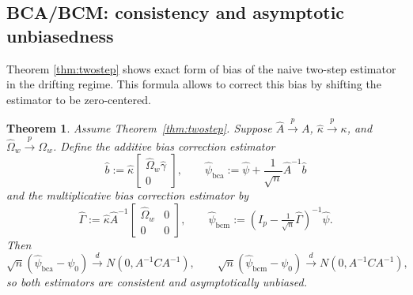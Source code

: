 \documentclass[11pt]{article}
\newtheorem{theorem}{Theorem}
\theoremstyle{definition}
\theoremstyle{remark}
\newcommand{\toP}{\xrightarrow{\,p\,}}
\newcommand{\tod}{\xrightarrow{\,d\,}}
\begin{document}
\subsection{BCA/BCM: consistency and asymptotic unbiasedness}
Theorem \ref{thm:twostep} shows exact form of bias of the naive two-step estimator in the drifting regime. This formula allows to correct this bias by shifting the estimator to be zero-centered.

\begin{theorem}\label{thm:bca-bcm}
Assume Theorem~\ref{thm:twostep}. Suppose $\hat A\toP A$, $\hat\kappa\toP\kappa$, and $\hat\Omega_w\toP\Omega_w$.
Define the additive bias correction estimator
\[
\hat b:=\hat\kappa\begin{bmatrix}\hat\Omega_w\hat\gamma \\0\end{bmatrix},\qquad
\hat\psi_{\mathrm{bca}}:=\hat\psi+\frac{1}{\sqrt{n}}\hat A^{-1}\hat b
\]
and the multiplicative bias correction estimator by
\[
\hat\Gamma:=\hat\kappa \hat A^{-1}\begin{bmatrix} \hat\Omega_w & 0 \\ 0 & 0 \end{bmatrix} ,\qquad
\hat\psi_{\mathrm{bcm}}:=(I_p-\tfrac{1}{\sqrt{n}}\hat\Gamma)^{-1}\hat\psi.
\]
Then
\[
\sqrt{n}(\hat\psi_{\mathrm{bca}}-\psi_0)\tod N(0,A^{-1}CA^{-1}),\qquad
\sqrt{n}(\hat\psi_{\mathrm{bcm}}-\psi_0)\tod N(0,A^{-1}CA^{-1}),
\]
so both estimators are consistent and asymptotically unbiased.
\end{theorem}
\end{document}
